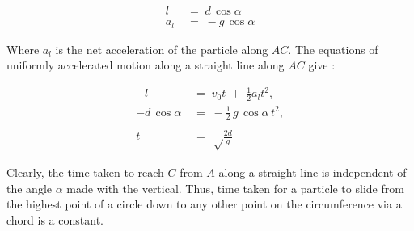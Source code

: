 \documentclass[11pt,reqno]{article}
\begin{document}
\begin{align*}
	l		\;&=\;	d \,\cos\alpha			\\
	a_{l}	\;&=\;	-g \,\cos\alpha
\end{align*}

Where $a_l$ is the net acceleration of the particle along $AC$.
The equations of uniformly accelerated motion along a straight line along $AC$ give :

\begin{align*}
	-l		\;&=\;	v_0 t	\;+\;	\frac{1}{2}a_lt^2,		\\
	-d\,\cos\alpha	\;&=\;	-\frac{1}{2}\,g\,\cos\alpha\,t^2, \\\\
	t	\;&=\;	\sqrt\frac{2d}{g}
\end{align*}

Clearly, the time taken to reach $C$ from $A$ along a straight line is independent of the angle $\alpha$ made with the vertical. Thus, time taken for a particle to slide from the highest point of a circle down to any other point on the circumference via a chord is a constant.
\end{document}
